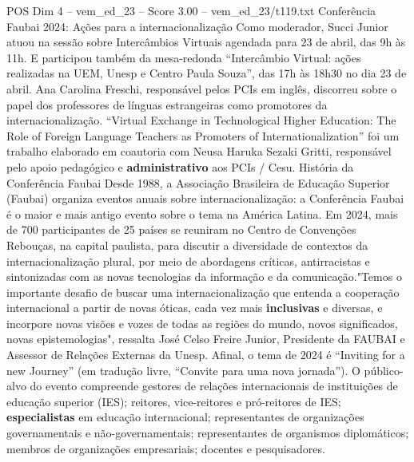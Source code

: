 \begin{textsample}{POS Dim 4 – vem\_ed\_23 – Score 3.00 – vem\_ed\_23/t119.txt}  \label{ex:f4_pos_089}
Conferência Faubai 2024: Ações para a internacionalização Como moderador, Succi Junior atuou na sessão sobre Intercâmbios Virtuais agendada para 23 de abril, das 9h às 11h.
E participou também da mesa-redonda “Intercâmbio Virtual: ações realizadas na UEM, Unesp e Centro Paula Souza”, das 17h às 18h30 no dia 23 de abril.
Ana Carolina Freschi, responsável pelos PCIs em inglês, discorreu sobre o papel dos professores de línguas estrangeiras como promotores da internacionalização. “Virtual Exchange in Technological Higher Education: The Role of Foreign Language Teachers as Promoters of Internationalization” foi um trabalho elaborado em coautoria com Neusa Haruka Sezaki Gritti, responsável pelo apoio pedagógico e \textbf{administrativo} aos PCIs / Cesu.
História da Conferência Faubai Desde 1988, a Associação Brasileira de Educação Superior (Faubai) organiza eventos anuais sobre internacionalização: a Conferência Faubai é o maior e mais antigo evento sobre o tema na América Latina.
Em 2024, mais de 700 participantes de 25 países se reuniram no Centro de Convenções Rebouças, na capital paulista, para discutir a diversidade de contextos da internacionalização plural, por meio de abordagens críticas, antirracistas e sintonizadas com as novas tecnologias da informação e da comunicação."Temos o importante desafio de buscar uma internacionalização que entenda a cooperação internacional a partir de novas óticas, cada vez mais \textbf{inclusivas} e diversas, e incorpore novas visões e vozes de todas as regiões do mundo, novos significados, novas epistemologias", ressalta José Celso Freire Junior, Presidente da FAUBAI e Assessor de Relações Externas da Unesp.
Afinal, o tema de 2024 é “Inviting for a new Journey” (em tradução livre, “Convite para uma nova jornada”).
O público-alvo do evento compreende gestores de relações internacionais de instituições de educação superior (IES); reitores, vice-reitores e pró-reitores de IES; \textbf{especialistas} em educação internacional; representantes de organizações governamentais e não-governamentais; representantes de organismos diplomáticos; membros de organizações empresariais; docentes e pesquisadores.

\end{textsample}
